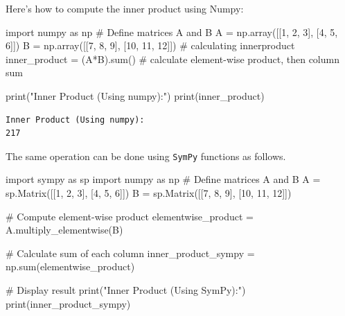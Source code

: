 \documentclass[
  letterpaper,
  DIV=11,
  numbers=noendperiod]{scrreprt}
\newenvironment{Shaded}{\begin{snugshade}}{\end{snugshade}}
\newcommand{\BuiltInTok}[1]{\textcolor[rgb]{0.00,0.23,0.31}{#1}}
\newcommand{\CommentTok}[1]{\textcolor[rgb]{0.37,0.37,0.37}{#1}}
\newcommand{\DecValTok}[1]{\textcolor[rgb]{0.68,0.00,0.00}{#1}}
\newcommand{\ImportTok}[1]{\textcolor[rgb]{0.00,0.46,0.62}{#1}}
\newcommand{\NormalTok}[1]{\textcolor[rgb]{0.00,0.23,0.31}{#1}}
\newcommand{\OperatorTok}[1]{\textcolor[rgb]{0.37,0.37,0.37}{#1}}
\newcommand{\StringTok}[1]{\textcolor[rgb]{0.13,0.47,0.30}{#1}}
\theoremstyle{plain}
\theoremstyle{definition}
\theoremstyle{remark}
\begin{document}
Here's how to compute the inner product using Numpy:

\begin{Shaded}
\begin{Highlighting}[]
\ImportTok{import}\NormalTok{ numpy }\ImportTok{as}\NormalTok{ np}
\CommentTok{\# Define matrices A and B}
\NormalTok{A }\OperatorTok{=}\NormalTok{ np.array([[}\DecValTok{1}\NormalTok{, }\DecValTok{2}\NormalTok{, }\DecValTok{3}\NormalTok{], [}\DecValTok{4}\NormalTok{, }\DecValTok{5}\NormalTok{, }\DecValTok{6}\NormalTok{]])}
\NormalTok{B }\OperatorTok{=}\NormalTok{ np.array([[}\DecValTok{7}\NormalTok{, }\DecValTok{8}\NormalTok{, }\DecValTok{9}\NormalTok{], [}\DecValTok{10}\NormalTok{, }\DecValTok{11}\NormalTok{, }\DecValTok{12}\NormalTok{]])}
\CommentTok{\# calculating innerproduct}
\NormalTok{inner\_product }\OperatorTok{=}\NormalTok{ (A}\OperatorTok{*}\NormalTok{B).}\BuiltInTok{sum}\NormalTok{() }\CommentTok{\# calculate element{-}wise product, then column sum}

\BuiltInTok{print}\NormalTok{(}\StringTok{"Inner Product (Using numpy):"}\NormalTok{)}
\BuiltInTok{print}\NormalTok{(inner\_product)}
\end{Highlighting}
\end{Shaded}

\begin{verbatim}
Inner Product (Using numpy):
217
\end{verbatim}

The same operation can be done using \texttt{SymPy} functions as
follows.

\begin{Shaded}
\begin{Highlighting}[]
\ImportTok{import}\NormalTok{ sympy }\ImportTok{as}\NormalTok{ sp}
\ImportTok{import}\NormalTok{ numpy }\ImportTok{as}\NormalTok{ np  }
\CommentTok{\# Define matrices A and B}
\NormalTok{A }\OperatorTok{=}\NormalTok{ sp.Matrix([[}\DecValTok{1}\NormalTok{, }\DecValTok{2}\NormalTok{, }\DecValTok{3}\NormalTok{], [}\DecValTok{4}\NormalTok{, }\DecValTok{5}\NormalTok{, }\DecValTok{6}\NormalTok{]])}
\NormalTok{B }\OperatorTok{=}\NormalTok{ sp.Matrix([[}\DecValTok{7}\NormalTok{, }\DecValTok{8}\NormalTok{, }\DecValTok{9}\NormalTok{], [}\DecValTok{10}\NormalTok{, }\DecValTok{11}\NormalTok{, }\DecValTok{12}\NormalTok{]])}

\CommentTok{\# Compute element{-}wise product}
\NormalTok{elementwise\_product }\OperatorTok{=}\NormalTok{ A.multiply\_elementwise(B)}

\CommentTok{\# Calculate sum of each column}
\NormalTok{inner\_product\_sympy }\OperatorTok{=}\NormalTok{ np.}\BuiltInTok{sum}\NormalTok{(elementwise\_product)}

\CommentTok{\# Display result}
\BuiltInTok{print}\NormalTok{(}\StringTok{"Inner Product (Using SymPy):"}\NormalTok{)}
\BuiltInTok{print}\NormalTok{(inner\_product\_sympy)}
\end{Highlighting}
\end{Shaded}
\end{document}
